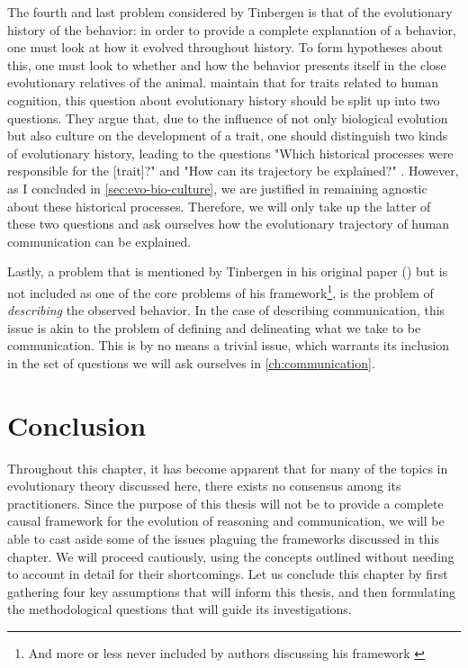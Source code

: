 The fourth and last problem considered by Tinbergen is that of the evolutionary history of the behavior: in order to provide a complete explanation of a behavior, one must look at how it evolved throughout history. To form hypotheses about this, one must look to whether and how the behavior presents itself in the close evolutionary relatives of the animal.
\citet{BatesonLaland13} maintain that for traits related to human cognition, this question about evolutionary history should be split up into two questions. They argue that, due to the influence of not only biological evolution but also culture on the development of a trait, one should distinguish two kinds of evolutionary history, leading to the questions "Which historical processes were responsible for the [trait]?" and "How can its trajectory be explained?" \citep[p.~714]{BatesonLaland13}. However, as I concluded in \cref{sec:evo-bio-culture}, we are justified in remaining agnostic about these historical processes. Therefore, we will only take up the latter of these two questions and ask ourselves how the evolutionary trajectory of human communication can be explained.

Lastly, a problem that is mentioned by Tinbergen in his original paper (\citeyear{Tinbergen63}) but is not included as one of the core problems of his framework\footnote{And more or less never included by authors discussing his framework \citep{LB02, Laland13, AllenBekoff95}}, is the problem of \emph{describing} the observed behavior.
In the case of describing communication, this issue is akin to the problem of defining and delineating what we take to be communication. This is by no means a trivial issue, which warrants its inclusion in the set of questions we will ask ourselves in \cref{ch:communication}.

\section{Conclusion}
\label{sec:evo-conclusion}
Throughout this chapter, it has become apparent that for many of the topics in evolutionary theory discussed here, there exists no consensus among its practitioners. Since the purpose of this thesis will not be to provide a complete causal framework for the evolution of reasoning and communication, we will be able to cast aside some of the issues plaguing the frameworks discussed in this chapter. We will proceed cautiously, using the concepts outlined without needing to account in detail for their shortcomings.
Let us conclude this chapter by first gathering four key assumptions that will inform this thesis, and then formulating the methodological questions that will guide its investigations.

